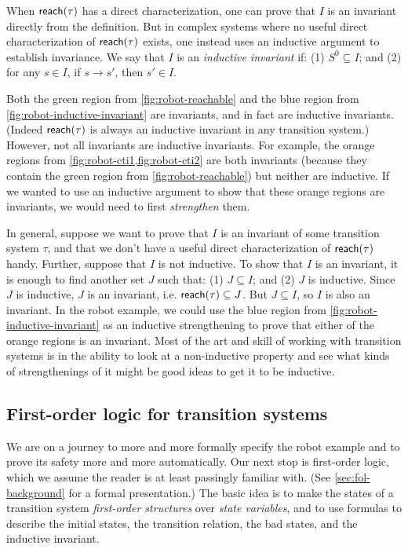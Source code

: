 When $\mathsf{reach}(\tau)$ has a direct characterization,
  one can prove that $I$ is an invariant directly from the definition.
But in complex systems where
  no useful direct characterization of $\mathsf{reach}(\tau)$ exists,
  one instead uses an inductive argument to establish invariance.
We say that $I$ is an \emph{inductive invariant} if:
  (1) $S^0\subseteq I$; and
  (2) for any $s\in I$, if $s\to s'$, then $s' \in I$.

Both the green region from \cref{fig:robot-reachable} and
  the blue region from \cref{fig:robot-inductive-invariant}
  are invariants, and in fact are inductive invariants.
(Indeed $\mathsf{reach}(\tau)$ is always an inductive invariant in any transition system.)
However, not all invariants are inductive invariants.
For example, the orange regions from \cref{fig:robot-cti1,fig:robot-cti2}
  are both invariants (because they contain the green region from \cref{fig:robot-reachable})
  but neither are inductive.
If we wanted to use an inductive argument to show
  that these orange regions are invariants,
  we would need to first \emph{strengthen} them.

In general, suppose we want to prove that $I$ is an invariant of some transition system $\tau$,
  and that we don't have a useful direct characterization of $\mathsf{reach}(\tau)$ handy.
Further, suppose that $I$ is not inductive.
To show that $I$ is an invariant, it is enough to find another set $J$ such that:
  (1) $J\subseteq I$; and
  (2) $J$ is inductive.
Since $J$ is inductive, $J$ is an invariant, i.e. $\mathsf{reach}(\tau)\subseteq J$.
But $J\subseteq I$, so $I$ is also an invariant.
In the robot example, we could use the blue region from \cref{fig:robot-inductive-invariant}
  as an inductive strengthening
  to prove that either of the orange regions is an invariant.
Most of the art and skill of working with transition systems
  is in the ability to look at a non-inductive property
  and see what kinds of strengthenings of it
  might be good ideas to get it to be inductive.


\subsection{First-order logic for transition systems}\label{ssec:fol-tr}

We are on a journey to more and more formally specify the robot example
  and to prove its safety more and more automatically.
Our next stop is first-order logic,
  which we assume the reader is at least passingly familiar with.
(See \cref{sec:fol-background} for a formal presentation.)
The basic idea is to make the states of a transition system
  \emph{first-order structures} over \emph{state variables}, and
  to use formulas to describe the initial states,
  the transition relation, the bad states,
  and the inductive invariant.

